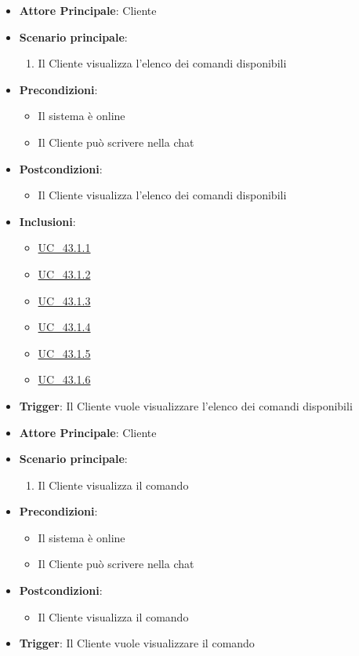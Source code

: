 \label{uc_43.1}
\begin{itemize}
    \item \textbf{Attore Principale}: Cliente
	\item \textbf{Scenario principale}:
	\begin{enumerate}
		\item Il Cliente visualizza l'elenco dei comandi disponibili
	\end{enumerate}
	\item \textbf{Precondizioni}:
	\begin{itemize}
		\item Il sistema è online 
		\item Il Cliente può scrivere nella chat
	\end{itemize}
	\item \textbf{Postcondizioni}:
	\begin{itemize}
		\item Il Cliente visualizza l'elenco dei comandi disponibili
	\end{itemize}
	\item \textbf{Inclusioni}:
	\begin{itemize}
		\item \hyperref[uc_43.1.1]{UC\_43.1.1}
		\item \hyperref[uc_43.1.2]{UC\_43.1.2}
		\item \hyperref[uc_43.1.3]{UC\_43.1.3}
		\item \hyperref[uc_43.1.4]{UC\_43.1.4}
		\item \hyperref[uc_43.1.5]{UC\_43.1.5}
		\item \hyperref[uc_43.1.6]{UC\_43.1.6}
	\end{itemize}
	\item \textbf{Trigger}: Il Cliente vuole visualizzare l'elenco dei comandi disponibili 
\end{itemize}

\label{uc_43.1.1}
\begin{itemize}
    \item \textbf{Attore Principale}: Cliente
	\item \textbf{Scenario principale}:
	\begin{enumerate}
		\item Il Cliente visualizza il comando 
	\end{enumerate}
	\item \textbf{Precondizioni}:
	\begin{itemize}
		\item Il sistema è online 
		\item Il Cliente può scrivere nella chat
	\end{itemize}
	\item \textbf{Postcondizioni}:
	\begin{itemize}
		\item Il Cliente visualizza il comando 
	\end{itemize}
	\item \textbf{Trigger}: Il Cliente vuole visualizzare il comando 
\end{itemize}


